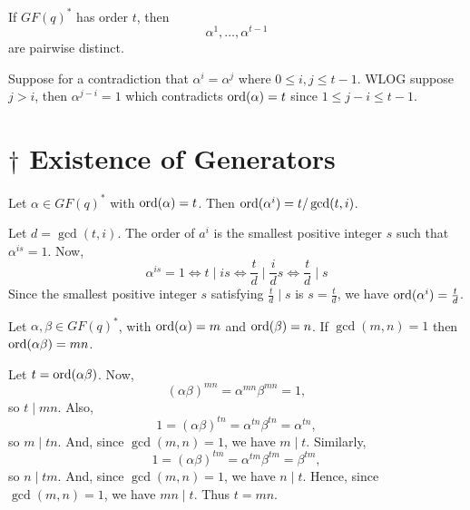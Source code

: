 
\begin{Theorem}{}{}
    If $ GF(q)^* $ has order $ t $, then
    \[ \alpha^1,\ldots,\alpha^{t-1} \]
    are pairwise distinct.
\end{Theorem}

\begin{Proof}{}{}
    Suppose for a contradiction that $ \alpha^i=\alpha^j $ where $ 0\leqslant i,j\leqslant t-1 $.
    WLOG suppose $ j>i $, then $ \alpha^{j-i}=1 $ which contradicts $ \operatorname{ord}(\alpha)=t $
    since $ 1\leqslant j-i\leqslant t-1 $.
\end{Proof}

\section{\texorpdfstring{$ \dagger $}{†} Existence of Generators}

\begin{Lemma}{}{}
    Let $ \alpha\in GF(q)^* $ with $ \operatorname{ord}(\alpha)=t $. Then $ \operatorname{ord}(\alpha^i)=
        t/\gcd(t,i) $.
\end{Lemma}

\begin{Proof}{}{}
    Let $ d=\gcd(t,i) $. The order of $ a^i $ is the smallest positive
    integer $ s $ such that $ \alpha^{is}=1 $. Now,
    \[ \alpha^{is}=1\iff t\mid is\iff \frac{t}{d}\mid \frac{i}{d}s
        \iff \frac{t}{d} \mid s \]
    Since the smallest positive integer $ s $ satisfying $ \frac{t}{d} \mid s $
    is $ s=\frac{t}{d} $, we have $ \operatorname{ord}(\alpha^i)=\frac{t}{d} $.
\end{Proof}

\begin{Lemma}{}{}
    Let $ \alpha,\beta\in GF(q)^* $, with $ \operatorname{ord}(\alpha)=m $ and $ \operatorname{ord}(\beta)=n $.
    If $ \gcd(m,n)=1 $ then $ \operatorname{ord}(\alpha\beta)=mn $.
\end{Lemma}

\begin{Proof}{}{}
    Let $ t=\operatorname{ord}(\alpha\beta) $. Now,
    \[ (\alpha\beta)^{mn}=\alpha^{mn}\beta^{mn}=1, \]
    so $ t\mid mn $. Also,
    \[ 1=(\alpha\beta)^{tn}=\alpha^{tn}\beta^{tn}=\alpha^{tn}, \]
    so $ m\mid tn $. And, since $ \gcd(m,n)=1 $, we have $ m\mid t $. Similarly,
    \[ 1=(\alpha\beta)^{tm}=\alpha^{tm}\beta^{tm}=\beta^{tm}, \]
    so $ n\mid tm $. And, since $ \gcd(m,n)=1 $, we have $ n\mid t $. Hence, since $ \gcd(m,n)=1 $,
    we have $ mn\mid t $. Thus $ t=mn $.
\end{Proof}

